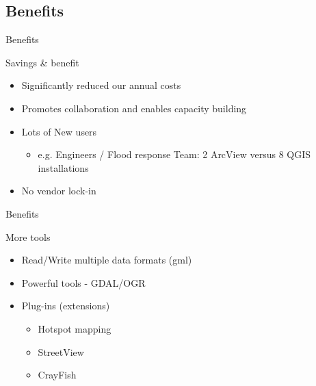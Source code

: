 \subsection{Benefits}

\begin{frame}{Benefits}
	\begin{block}{Savings \& benefit}
		\begin{itemize}
			\item Significantly reduced our annual costs 
			\item Promotes collaboration and enables capacity building 
			
			\item Lots of New users
				\begin{itemize}
					\item e.g. Engineers / Flood response Team: 2 ArcView versus 8 QGIS installations
					
				\end{itemize}
						
			\item No vendor lock-in
						
		\end{itemize}
	\end{block}
\end{frame}

\begin{frame}{Benefits}
	\begin{block}{More tools}
		\begin{itemize}
			\item Read/Write multiple data formats (gml)
			 \item Powerful tools - GDAL/OGR
			\item Plug-ins (extensions)
			\begin{itemize}
				\item Hotspot mapping
				
				\item StreetView
				
				\item CrayFish
			\end{itemize}		

						
		\end{itemize}
	\end{block}
\end{frame}

